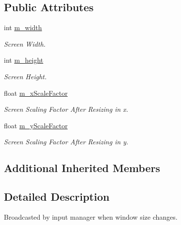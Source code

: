 \subsection*{Public Attributes}
\begin{DoxyCompactItemize}
\item 
\mbox{\label{classWindowSizeEvent_a7991c979e48672d7e7403a7912f6a81f}} 
int \hyperlink{classWindowSizeEvent_a7991c979e48672d7e7403a7912f6a81f}{m\+\_\+width}
\begin{DoxyCompactList}\small\item\em Screen Width. \end{DoxyCompactList}\item 
\mbox{\label{classWindowSizeEvent_a7aa93c7985bee65f78075dd1a456eccf}} 
int \hyperlink{classWindowSizeEvent_a7aa93c7985bee65f78075dd1a456eccf}{m\+\_\+height}
\begin{DoxyCompactList}\small\item\em Screen Height. \end{DoxyCompactList}\item 
\mbox{\label{classWindowSizeEvent_a5b864b7b687fb2ed518baab2fa5517f0}} 
float \hyperlink{classWindowSizeEvent_a5b864b7b687fb2ed518baab2fa5517f0}{m\+\_\+x\+Scale\+Factor}
\begin{DoxyCompactList}\small\item\em Screen Scaling Factor After Resizing in x. \end{DoxyCompactList}\item 
\mbox{\label{classWindowSizeEvent_a5269bcdabe834e2d5d23bb7fd56a55a8}} 
float \hyperlink{classWindowSizeEvent_a5269bcdabe834e2d5d23bb7fd56a55a8}{m\+\_\+y\+Scale\+Factor}
\begin{DoxyCompactList}\small\item\em Screen Scaling Factor After Resizing in y. \end{DoxyCompactList}\end{DoxyCompactItemize}
\subsection*{Additional Inherited Members}


\subsection{Detailed Description}
Broadcasted by input manager when window size changes. 

